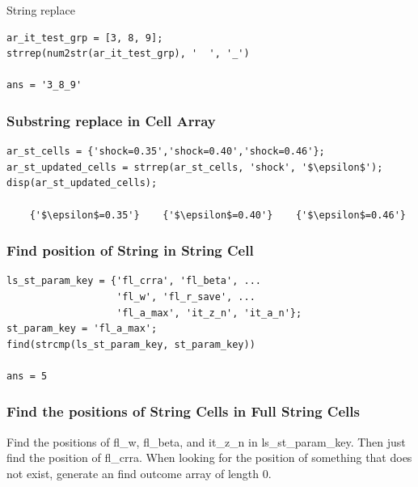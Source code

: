 \documentclass[
]{book}
\begin{document}
String replace

\begin{verbatim}
ar_it_test_grp = [3, 8, 9];
strrep(num2str(ar_it_test_grp), '  ', '_')

ans = '3_8_9'
\end{verbatim}

\hypertarget{substring-replace-in-cell-array}{%
\subsubsection{Substring replace in Cell Array}\label{substring-replace-in-cell-array}}

\begin{verbatim}
ar_st_cells = {'shock=0.35','shock=0.40','shock=0.46'};
ar_st_updated_cells = strrep(ar_st_cells, 'shock', '$\epsilon$');
disp(ar_st_updated_cells);

    {'$\epsilon$=0.35'}    {'$\epsilon$=0.40'}    {'$\epsilon$=0.46'}
\end{verbatim}

\hypertarget{find-position-of-string-in-string-cell}{%
\subsubsection{Find position of String in String Cell}\label{find-position-of-string-in-string-cell}}

\begin{verbatim}
ls_st_param_key = {'fl_crra', 'fl_beta', ...
                   'fl_w', 'fl_r_save', ...
                   'fl_a_max', 'it_z_n', 'it_a_n'};
st_param_key = 'fl_a_max';
find(strcmp(ls_st_param_key, st_param_key))

ans = 5
\end{verbatim}

\hypertarget{find-the-positions-of-string-cells-in-full-string-cells}{%
\subsubsection{Find the positions of String Cells in Full String Cells}\label{find-the-positions-of-string-cells-in-full-string-cells}}

Find the positions of fl\_w, fl\_beta, and it\_z\_n in ls\_st\_param\_key.
Then just find the position of fl\_crra. When looking for the position of
something that does not exist, generate an find outcome array of length
0.
\end{document}
